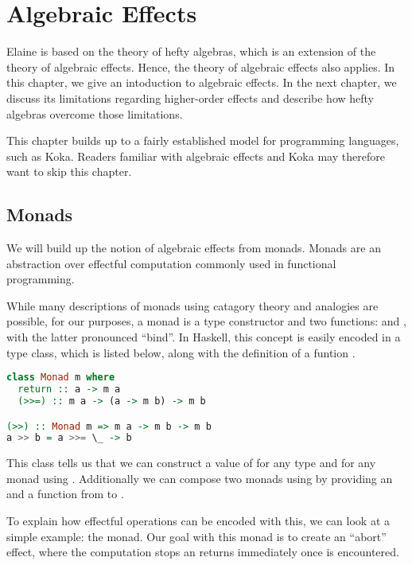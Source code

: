 \chapter{Algebraic Effects}\label{chap:algebraic_effects}

Elaine is based on the theory of hefty algebras, which is an extension of the theory of algebraic effects. Hence, the theory of algebraic effects also applies. In this chapter, we give an intoduction to algebraic effects. In the next chapter, we discuss its limitations regarding higher-order effects and describe how hefty algebras overcome those limitations.

This chapter builds up to a fairly established model for programming languages, such as Koka. Readers familiar with algebraic effects and Koka may therefore want to skip this chapter.

\section{Monads}


We will build up the notion of algebraic effects from monads. Monads are an abstraction over effectful computation commonly used in functional programming.

While many descriptions of monads using catagory theory and analogies are possible, for our purposes, a monad is a type constructor  and two functions:  and \hs{>>=}, with the latter pronounced ``bind''. In Haskell, this concept is easily encoded in a type class, which is listed below, along with the definition of a funtion \hs{>>}.

\begin{lstlisting}[language=haskell,style=fancy]
class Monad m where
  return :: a -> m a
  (>>=) :: m a -> (a -> m b) -> m b

(>>) :: Monad m => m a -> m b -> m b
a >> b = a >>= \_ -> b
\end{lstlisting}

This class tells us that we can construct a value of  for any type  and for any monad  using . Additionally we can compose two monads using \hs{>>=} by providing an  and a function from  to .

To explain how effectful operations can be encoded with this, we can look at a simple example: the  monad. Our goal with this monad is to create an ``abort'' effect, where the computation stops an returns immediately once  is encountered.

